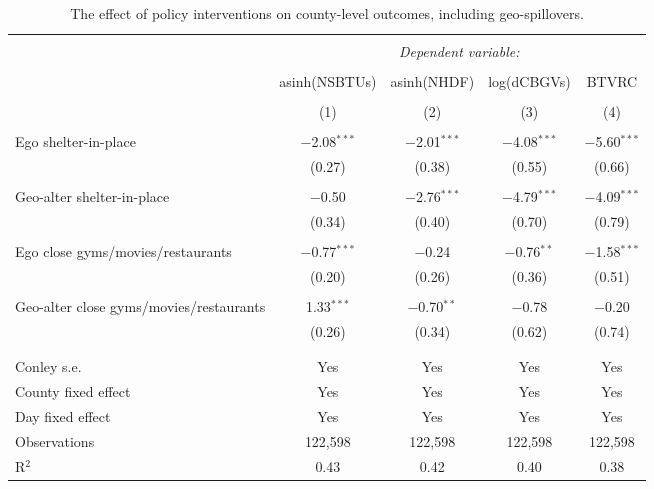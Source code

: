 
\begin{table}[!htbp] \centering 
  \caption{The effect of policy interventions on county-level outcomes, including geo-spillovers.} 
  \label{tab:diff_in_diff_with_sp_geo} 
\footnotesize 
\begin{tabular}{@{\extracolsep{5pt}}lcccc} 
\\[-1.8ex]\hline 
\hline \\[-1.8ex] 
 & \multicolumn{4}{c}{\textit{Dependent variable:}} \\ 
\cline{2-5} 
\\[-1.8ex] & asinh(NSBTUs) & asinh(NHDF) & log(dCBGVs) & BTVRC \\ 
\\[-1.8ex] & (1) & (2) & (3) & (4)\\ 
\hline \\[-1.8ex] 
 Ego shelter-in-place & $-$2.08$^{***}$ & $-$2.01$^{***}$ & $-$4.08$^{***}$ & $-$5.60$^{***}$ \\ 
  & (0.27) & (0.38) & (0.55) & (0.66) \\ 
  & & & & \\ 
 Geo-alter shelter-in-place & $-$0.50 & $-$2.76$^{***}$ & $-$4.79$^{***}$ & $-$4.09$^{***}$ \\ 
  & (0.34) & (0.40) & (0.70) & (0.79) \\ 
  & & & & \\ 
 Ego close gyms/movies/restaurants & $-$0.77$^{***}$ & $-$0.24 & $-$0.76$^{**}$ & $-$1.58$^{***}$ \\ 
  & (0.20) & (0.26) & (0.36) & (0.51) \\ 
  & & & & \\ 
 Geo-alter close gyms/movies/restaurants & 1.33$^{***}$ & $-$0.70$^{**}$ & $-$0.78 & $-$0.20 \\ 
  & (0.26) & (0.34) & (0.62) & (0.74) \\ 
  & & & & \\ 
\hline \\[-1.8ex] 
Conley s.e. & Yes & Yes & Yes & Yes \\ 
County fixed effect & Yes & Yes & Yes & Yes \\ 
Day fixed effect & Yes & Yes & Yes & Yes \\ 
Observations & 122,598 & 122,598 & 122,598 & 122,598 \\ 
R$^{2}$ & 0.43 & 0.42 & 0.40 & 0.38 \\ 

\end{tabular}
\end{table}
